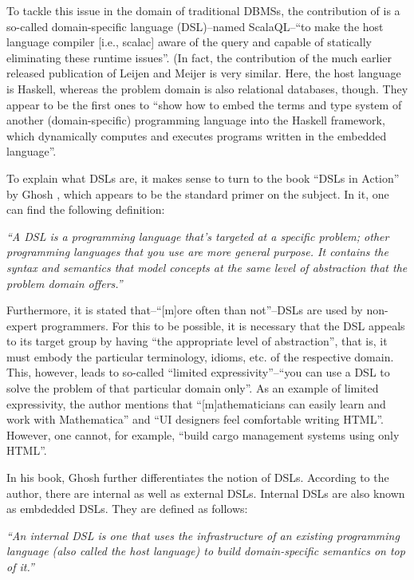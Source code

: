 \documentclass[article, type=bsc, colorback, accentcolor=tud8b, parskip=half, bibliography=totocnumbered]{tudthesis}
\begin{document}
To tackle this issue in the domain of traditional DBMSs, the contribution of \cite{Spiewak:2009:SLD:2127907.2127923} is a so-called domain-specific language (DSL)--named ScalaQL--``to make the host language compiler [i.e., scalac] aware of the query and capable of statically eliminating these runtime issues''.
(In fact, the contribution of the much earlier released publication of Leijen and Meijer \cite{Leijen:1999:DSE:331960.331977} is very similar.
Here, the host language is Haskell, whereas the problem domain is also relational databases, though.
They appear to be the first ones to ``show how to embed the terms and type system of another (domain-specific) programming language into the Haskell framework, which dynamically computes and executes programs written in the embedded language''.

To explain what DSLs are, it makes sense to turn to the book ``DSLs in Action'' by Ghosh \cite{Ghosh:2010:DA:1965333}, which appears to be the standard primer on the subject.
In it, one can find the following definition:

\emph{
``A DSL is a programming language that's targeted at a specific problem; other programming languages that you use are more general purpose.
It contains the syntax and semantics that model concepts at the same level of abstraction that the problem domain offers.''}

Furthermore, it is stated that--``[m]ore often than not''--DSLs are used by non-expert programmers.
For this to be possible, it is necessary that the DSL appeals to its target group by having ``the appropriate level of abstraction'', that is, it must embody the particular terminology, idioms, etc. of the respective domain.
This, however, leads to so-called ``limited expressivity''--``you can use a DSL to solve the problem of that particular domain only''.
As an example of limited expressivity, the author mentions that ``[m]athematicians can easily learn and work with Mathematica'' and ``UI designers feel comfortable writing HTML''.
However, one cannot, for example, ``build cargo management systems using only HTML''.

In his book, Ghosh further differentiates the notion of DSLs.
According to the author, there are internal as well as external DSLs.
Internal DSLs are also known as embdedded DSLs.
They are defined as follows:

\emph{``An internal DSL is one that uses the infrastructure of an existing programming language (also called the host language) to build domain-specific semantics on top of it.''}
\end{document}
